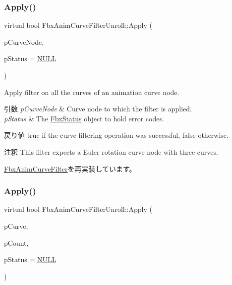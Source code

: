 \subsubsection{\texorpdfstring{Apply()}{Apply()}\hspace{0.1cm}{\footnotesize\ttfamily [3/5]}}
{\footnotesize\ttfamily virtual bool Fbx\+Anim\+Curve\+Filter\+Unroll\+::\+Apply (\begin{DoxyParamCaption}\item[{\hyperlink{class_fbx_anim_curve_node}{Fbx\+Anim\+Curve\+Node} \&}]{p\+Curve\+Node,  }\item[{\hyperlink{class_fbx_status}{Fbx\+Status} $\ast$}]{p\+Status = {\ttfamily \hyperlink{fbxarch_8h_a070d2ce7b6bb7e5c05602aa8c308d0c4}{N\+U\+LL}} }\end{DoxyParamCaption})\hspace{0.3cm}{\ttfamily [virtual]}}

Apply filter on all the curves of an animation curve node. 
\begin{DoxyParams}{引数}
{\em p\+Curve\+Node} & Curve node to which the filter is applied. \\
\hline
{\em p\+Status} & The \hyperlink{class_fbx_status}{Fbx\+Status} object to hold error codes. \\
\hline
\end{DoxyParams}
\begin{DoxyReturn}{戻り値}
{\ttfamily true} if the curve filtering operation was successful, {\ttfamily false} otherwise. 
\end{DoxyReturn}
\begin{DoxyRemark}{注釈}
This filter expects a Euler rotation curve node with three curves. 
\end{DoxyRemark}


\hyperlink{class_fbx_anim_curve_filter_ad042b45c0675278fa49e61739b0825c2}{Fbx\+Anim\+Curve\+Filter}を再実装しています。

\mbox{\label{class_fbx_anim_curve_filter_unroll_adcbc56499804749891e0140bd9c9f3f1}} 
\subsubsection{\texorpdfstring{Apply()}{Apply()}\hspace{0.1cm}{\footnotesize\ttfamily [4/5]}}
{\footnotesize\ttfamily virtual bool Fbx\+Anim\+Curve\+Filter\+Unroll\+::\+Apply (\begin{DoxyParamCaption}\item[{\hyperlink{class_fbx_anim_curve}{Fbx\+Anim\+Curve} $\ast$$\ast$}]{p\+Curve,  }\item[{int}]{p\+Count,  }\item[{\hyperlink{class_fbx_status}{Fbx\+Status} $\ast$}]{p\+Status = {\ttfamily \hyperlink{fbxarch_8h_a070d2ce7b6bb7e5c05602aa8c308d0c4}{N\+U\+LL}} }\end{DoxyParamCaption})\hspace{0.3cm}{\ttfamily [virtual]}}

